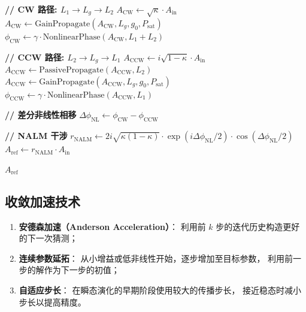 \documentclass[11pt,a4paper]{ctexart}
\begin{document}
\begin{algorithm}[htbp]
\caption{NALM 单次反射计算}
\label{alg:nalm_reflect}
\begin{algorithmic}[1]

  \State \textbf{// CW 路径: $L_1 \to L_g \to L_2$}
  \State $A_{\text{CW}} \gets \sqrt{\kappa} \cdot A_{\text{in}}$
  \State $A_{\text{CW}} \gets \text{GainPropagate}(A_{\text{CW}}, L_g, g_0, P_{\text{sat}})$
  \State $\phi_{\text{CW}} \gets \gamma \cdot \text{NonlinearPhase}(A_{\text{CW}}, L_1 + L_2)$

  \State \textbf{// CCW 路径: $L_2 \to L_g \to L_1$}
  \State $A_{\text{CCW}} \gets i\sqrt{1-\kappa} \cdot A_{\text{in}}$
  \State $A_{\text{CCW}} \gets \text{PassivePropagate}(A_{\text{CCW}}, L_2)$
  \State $A_{\text{CCW}} \gets \text{GainPropagate}(A_{\text{CCW}}, L_g, g_0, P_{\text{sat}})$
  \State $\phi_{\text{CCW}} \gets \gamma \cdot \text{NonlinearPhase}(A_{\text{CCW}}, L_1)$

  \State \textbf{// 差分非线性相移}
  \State $\Delta\phi_{\text{NL}} \gets \phi_{\text{CW}} - \phi_{\text{CCW}}$

  \State \textbf{// NALM 干涉}
  \State $r_{\text{NALM}} \gets 2i\sqrt{\kappa(1-\kappa)} \cdot \exp(i\Delta\phi_{\text{NL}}/2) \cdot \cos(\Delta\phi_{\text{NL}}/2)$
  \State $A_{\text{ref}} \gets r_{\text{NALM}} \cdot A_{\text{in}}$

  \State \Return $A_{\text{ref}}$
\EndFunction
\end{algorithmic}
\end{algorithm}

\subsection{收敛加速技术}

\begin{enumerate}
  \item \textbf{安德森加速（Anderson Acceleration）}：
        利用前 $k$ 步的迭代历史构造更好的下一次猜测；
  \item \textbf{连续参数延拓}：
        从小增益或低非线性开始，逐步增加至目标参数，
        利用前一步的解作为下一步的初值；
  \item \textbf{自适应步长}：
        在瞬态演化的早期阶段使用较大的传播步长，
        接近稳态时减小步长以提高精度。
\end{enumerate}

\end{document}
